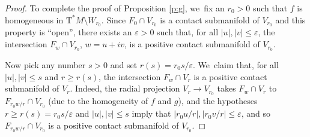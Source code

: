 \documentclass[JEP,XML,SOM,Unicode]{cedram}
\newcommand{\sT}{\mathrm{T}^\ast}
\let\eps\varepsilon
\theoremstyle{plain}
\theoremstyle{definition}
\begin{document}
\begin{proof}
To complete the proof of Proposition \ref{p:g}, we~fix an $r_0>0$ such
that $f$ is homogeneous in $\sT M \setminus W_{r_0}$. Since $F_0 \cap V_{r_0}$ is a
contact submanifold of $V_{r_0}$ and this property is ``open'', there exists an
$\eps>0$ such that, for all $|u|, |v| \le \eps$, the intersection $F_w \cap
V_{r_0}$, $w = u+iv$, is a positive contact submanifold of $V_{r_0}$.

Now pick any number $s>0$ and set $r(s) = r_0 s / \eps$. We~claim that, for all
\hbox{$|u|, |v| \le s$} and $r \ge r(s)$, the intersection $F_w \cap V_r$ is a positive
contact submanifold of $V_r$. Indeed, the radial projection $V_r \to V_{r_0}$
takes $F_w \cap V_r$ to $F_{r_0w/r} \cap V_{r_0}$ (due to the homogeneity of $f$
and $g$), and the hypotheses $r \ge r(s) = r_0 s / \eps$ and $|u|, |v| \le s$
imply that $|r_0u/r|, |r_0v/r| \le \eps$, and so $F_{r_0w/r} \cap V_{r_0}$ is a
positive contact submanifold of $V_{r_0}$.
\end{proof}
\end{document}
